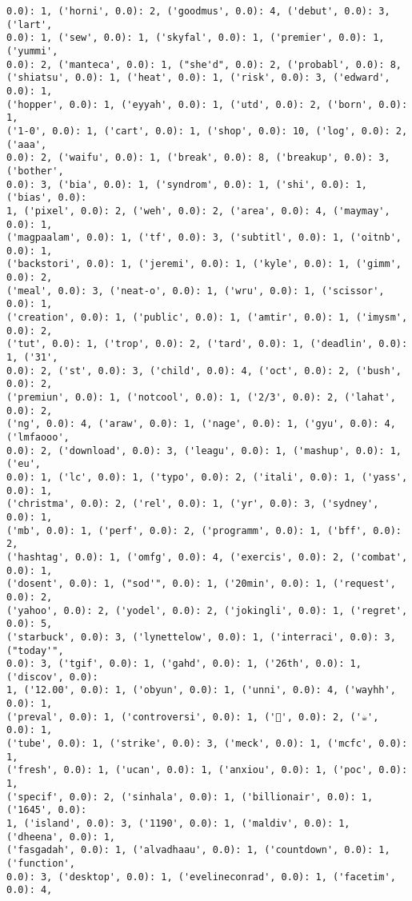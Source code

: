 \documentclass[11pt]{article}
\begin{document}
\begin{Verbatim}[commandchars=\\\{\}]
0.0): 1, ('horni', 0.0): 2, ('goodmus', 0.0): 4, ('debut', 0.0): 3, ('lart',
0.0): 1, ('sew', 0.0): 1, ('skyfal', 0.0): 1, ('premier', 0.0): 1, ('yummi',
0.0): 2, ('manteca', 0.0): 1, ("she'd", 0.0): 2, ('probabl', 0.0): 8,
('shiatsu', 0.0): 1, ('heat', 0.0): 1, ('risk', 0.0): 3, ('edward', 0.0): 1,
('hopper', 0.0): 1, ('eyyah', 0.0): 1, ('utd', 0.0): 2, ('born', 0.0): 1,
('1-0', 0.0): 1, ('cart', 0.0): 1, ('shop', 0.0): 10, ('log', 0.0): 2, ('aaa',
0.0): 2, ('waifu', 0.0): 1, ('break', 0.0): 8, ('breakup', 0.0): 3, ('bother',
0.0): 3, ('bia', 0.0): 1, ('syndrom', 0.0): 1, ('shi', 0.0): 1, ('bias', 0.0):
1, ('pixel', 0.0): 2, ('weh', 0.0): 2, ('area', 0.0): 4, ('maymay', 0.0): 1,
('magpaalam', 0.0): 1, ('tf', 0.0): 3, ('subtitl', 0.0): 1, ('oitnb', 0.0): 1,
('backstori', 0.0): 1, ('jeremi', 0.0): 1, ('kyle', 0.0): 1, ('gimm', 0.0): 2,
('meal', 0.0): 3, ('neat-o', 0.0): 1, ('wru', 0.0): 1, ('scissor', 0.0): 1,
('creation', 0.0): 1, ('public', 0.0): 1, ('amtir', 0.0): 1, ('imysm', 0.0): 2,
('tut', 0.0): 1, ('trop', 0.0): 2, ('tard', 0.0): 1, ('deadlin', 0.0): 1, ('31',
0.0): 2, ('st', 0.0): 3, ('child', 0.0): 4, ('oct', 0.0): 2, ('bush', 0.0): 2,
('premiun', 0.0): 1, ('notcool', 0.0): 1, ('2/3', 0.0): 2, ('lahat', 0.0): 2,
('ng', 0.0): 4, ('araw', 0.0): 1, ('nage', 0.0): 1, ('gyu', 0.0): 4, ('lmfaooo',
0.0): 2, ('download', 0.0): 3, ('leagu', 0.0): 1, ('mashup', 0.0): 1, ('eu',
0.0): 1, ('lc', 0.0): 1, ('typo', 0.0): 2, ('itali', 0.0): 1, ('yass', 0.0): 1,
('christma', 0.0): 2, ('rel', 0.0): 1, ('yr', 0.0): 3, ('sydney', 0.0): 1,
('mb', 0.0): 1, ('perf', 0.0): 2, ('programm', 0.0): 1, ('bff', 0.0): 2,
('hashtag', 0.0): 1, ('omfg', 0.0): 4, ('exercis', 0.0): 2, ('combat', 0.0): 1,
('dosent', 0.0): 1, ("sod'", 0.0): 1, ('20min', 0.0): 1, ('request', 0.0): 2,
('yahoo', 0.0): 2, ('yodel', 0.0): 2, ('jokingli', 0.0): 1, ('regret', 0.0): 5,
('starbuck', 0.0): 3, ('lynettelow', 0.0): 1, ('interraci', 0.0): 3, ("today'",
0.0): 3, ('tgif', 0.0): 1, ('gahd', 0.0): 1, ('26th', 0.0): 1, ('discov', 0.0):
1, ('12.00', 0.0): 1, ('obyun', 0.0): 1, ('unni', 0.0): 4, ('wayhh', 0.0): 1,
('preval', 0.0): 1, ('controversi', 0.0): 1, ('🍵', 0.0): 2, ('☕', 0.0): 1,
('tube', 0.0): 1, ('strike', 0.0): 3, ('meck', 0.0): 1, ('mcfc', 0.0): 1,
('fresh', 0.0): 1, ('ucan', 0.0): 1, ('anxiou', 0.0): 1, ('poc', 0.0): 1,
('specif', 0.0): 2, ('sinhala', 0.0): 1, ('billionair', 0.0): 1, ('1645', 0.0):
1, ('island', 0.0): 3, ('1190', 0.0): 1, ('maldiv', 0.0): 1, ('dheena', 0.0): 1,
('fasgadah', 0.0): 1, ('alvadhaau', 0.0): 1, ('countdown', 0.0): 1, ('function',
0.0): 3, ('desktop', 0.0): 1, ('evelineconrad', 0.0): 1, ('facetim', 0.0): 4,

\end{Verbatim}
\end{document}
